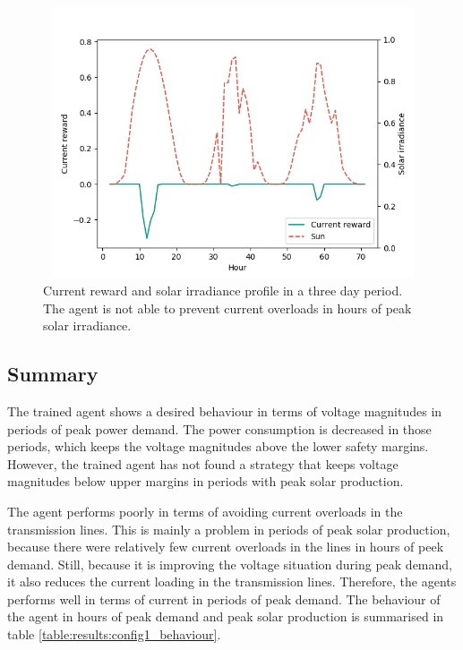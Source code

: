 \documentclass[class=book, crop=false, 11pt]{standalone}
\begin{document}
\begin{figure}[h]
    \center
\includegraphics[height=8cm, width=12cm]{figures/config1_bad_current.png}
    \caption[size = 9]{Current reward and solar irradiance profile in a three day period. The agent is not able to prevent current overloads in hours of peak solar irradiance.}
    \label{fig:results:config1_bad_current}
\end{figure}


\subsection{Summary}
The trained agent shows a desired behaviour in terms of voltage magnitudes in periods of peak power demand. The power consumption is decreased in those periods, which keeps the voltage magnitudes above the lower safety margins. However, the trained agent has not found a strategy that keeps voltage magnitudes below upper margins in periods with peak solar production.

The agent performs poorly in terms of avoiding current overloads in the transmission lines. This is mainly a problem in periods of peak solar production, because there were relatively few current overloads in the lines in hours of peek demand. Still, because it is improving the voltage situation during peak demand, it also reduces the current loading in the transmission lines. Therefore, the agents performs well in terms of current in periods of peak demand. The behaviour of the agent in hours of peak demand and peak solar production is summarised in table \ref{table:results:config1_behaviour}.
\end{document}
